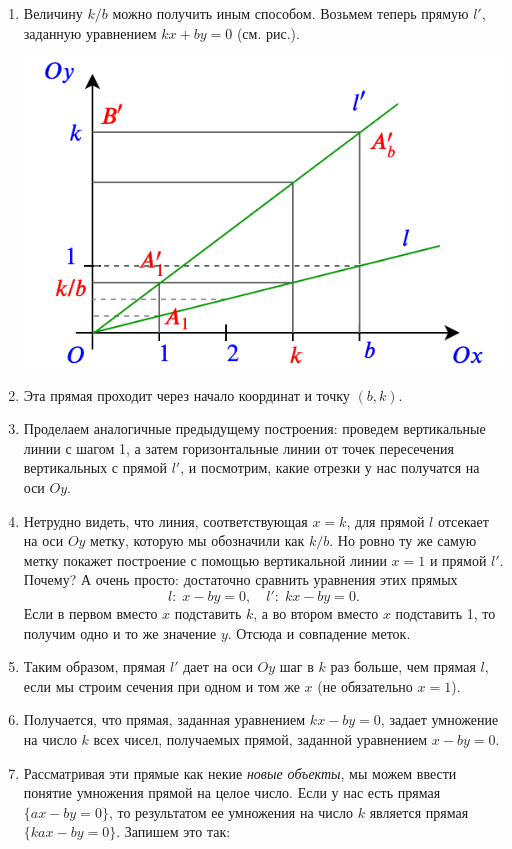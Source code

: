 \begin{enumerate}
\item Величину $k/b$ можно получить иным способом. Возьмем теперь прямую $l'$, заданную уравнением $kx+by=0$ (см. рис.).
\begin{center}
\includegraphics[scale=0.5]{sectionkb.png}
\end{center}
\item Эта прямая проходит через начало координат и точку $(b,k)$.
\item Проделаем аналогичные предыдущему построения: проведем вертикальные линии с шагом 1, а затем горизонтальные линии от точек пересечения вертикальных с прямой $l'$, и посмотрим, какие отрезки у нас получатся на оси $Oy$.
\item Нетрудно видеть, что линия, соответствующая $x=k$, для прямой $l$ отсекает на оси $Oy$ метку, которую мы обозначили как $k/b$. Но ровно ту же самую метку покажет построение с помощью вертикальной линии $x=1$ и прямой $l'$. Почему? А очень просто: достаточно сравнить уравнения этих прямых
$$
l:\;x-by=0,\quad l':\;kx-by=0.
$$
Если в первом вместо $x$ подставить $k$, а во втором вместо $x$ подставить 1, то получим одно и то же значение $y$. Отсюда и совпадение меток.
\item Таким образом, прямая $l'$ дает на оси $Oy$ шаг в $k$ раз больше, чем прямая $l$, если мы строим сечения при одном и том же $x$ (не обязательно $x=1$).
\item Получается, что прямая, заданная уравнением $kx-by=0$, задает умножение на число $k$ всех чисел, получаемых прямой, заданной уравнением $x-by=0$.
\item Рассматривая эти прямые как некие \textit{новые объекты}, мы можем ввести понятие умножения прямой на целое число. Если у нас есть прямая $\{ax-by=0\}$, то результатом ее умножения на число $k$ является прямая $\{kax-by=0\}$. Запишем это так:

\end{enumerate}
